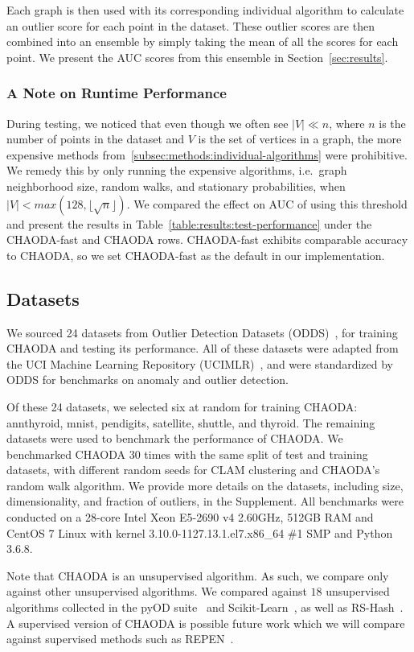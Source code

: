 Each graph is then used with its corresponding individual algorithm to calculate an outlier score for each point in the dataset.
These outlier scores are then combined into an ensemble by simply taking the mean of all the scores for each point.
We present the AUC scores from this ensemble in Section~\ref{sec:results}.

\subsubsection{A Note on Runtime Performance}

During testing, we noticed that even though we often see $|V| \ll n $, where $n$ is the number of points in the dataset and $V$ is the set of vertices in a graph, the more expensive methods from~\ref{subsec:methods:individual-algorithms} were prohibitive.
We remedy this by only running the expensive algorithms, i.e.\ graph neighborhood size, random walks, and stationary probabilities, when $|V| < max(128, \lfloor \sqrt n \rfloor)$.
We compared the effect on AUC of using this threshold and present the results in Table~\ref{table:results:test-performance} under the CHAODA-fast and CHAODA rows.
CHAODA-fast exhibits comparable accuracy to CHAODA, so we
set CHAODA-fast as the default in our implementation.


\subsection{Datasets}
\label{subsec:methods:datasets}

We sourced 24 datasets from Outlier Detection Datasets (ODDS)~\cite{rayana2016odds}, for training CHAODA and testing its performance.
All of these datasets were adapted from the UCI Machine Learning Repository (UCIMLR)~\cite{UCIMLR}, and were standardized by ODDS for benchmarks on anomaly and outlier detection.

Of these 24 datasets, we selected six at random for training CHAODA: annthyroid, mnist, pendigits, satellite, shuttle, and thyroid.
The remaining datasets were used to benchmark the performance of CHAODA\@.
We benchmarked CHAODA 30 times with the same split of test and training datasets, with different random seeds for CLAM clustering and CHAODA's random walk algorithm.
We provide more details on the datasets, including size, dimensionality, and fraction of outliers, in the Supplement.
All benchmarks were conducted on a 28-core Intel Xeon E5-2690 v4 2.60GHz, 512GB RAM and CentOS 7 Linux with kernel 3.10.0-1127.13.1.el7.x86\_64 \#1 SMP and Python 3.6.8.

Note that CHAODA is an unsupervised algorithm.
As such, we compare only against other unsupervised algorithms.
We compared against $18$ unsupervised algorithms collected in the pyOD suite~\cite{zhao2019pyod} and Scikit-Learn~\cite{pedregosa2011scikit}, as well as RS-Hash~\cite{sathe2016subspace}.
A supervised version of CHAODA is possible future work which we will compare against supervised methods such as REPEN~\cite{pang2018learning}.